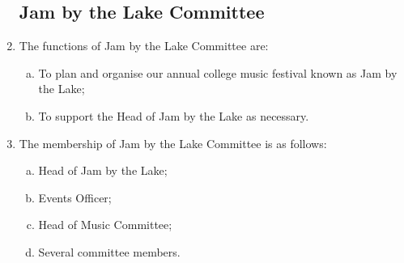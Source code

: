 \documentclass[12pt]{article}
\begin{document}
\begin{enumerate}
    \subsection{Jam by the Lake Committee}
    \item The functions of Jam by the Lake Committee are:
    \begin{enumerate}[(a)]
        \item To plan and organise our annual college music festival known as Jam by the Lake;
        \item To support the Head of Jam by the Lake as necessary.
    \end{enumerate}
    \item The membership of Jam by the Lake Committee is as follows:
    \begin{enumerate}[(a)]
        \item Head of Jam by the Lake;
        \item Events Officer;
        \item Head of Music Committee;
        \item Several committee members.
    \end{enumerate}


\end{enumerate}
\end{document}
